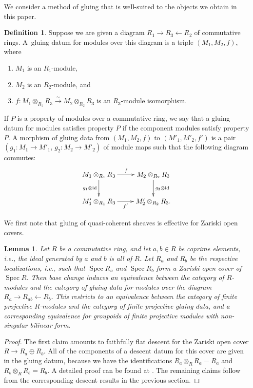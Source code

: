 \documentclass[pdftex]{sigma}
\DeclareMathOperator{\Spec}{Spec}
\newcommand{\simto}{\overset{\sim}{\to}}
\newtheorem{lem}[thm]{Lemma}
\theoremstyle{definition}
\newtheorem{defn}[thm]{Definition}
\begin{document}
We consider a method of gluing that is well-suited to the objects we obtain in this paper.

\begin{defn}Suppose we are given a diagram $R_1 \to R_3 \leftarrow R_2$ of commutative rings. A~gluing datum for modules over this diagram is a triple $(M_1, M_2, f)$, where
\begin{enumerate}\itemsep=0pt
\item[1)] $M_1$ is an $R_1$-module,
\item[2)] $M_2$ is an $R_2$-module, and
\item[3)] $f\colon M_1 \otimes_{R_1} R_3 \simto M_2 \otimes_{R_2} R_3$ is an $R_3$-module isomorphism.
\end{enumerate}
If $P$ is a property of modules over a commutative ring, we say that a gluing datum for modules satisfies property $P$ if the component modules satisfy property $P$. A morphism of gluing data from $(M_1, M_2, f)$ to $(M'_1, M'_2, f')$ is a pair $(g_1\colon M_1 \to M'_1,\, g_2\colon M_2 \to M'_2)$ of module maps such that the following diagram commutes:
\begin{gather*} \xymatrix{ M_1 \otimes_{R_1} R_3 \ar[r]^-{f} \ar[d]_{g_1 \otimes {\rm id}} & M_2 \otimes_{R_2} R_3 \ar[d]^{g_2 \otimes {\rm id}} \\ M'_1 \otimes_{R_1} R_3 \ar[r]_-{f'} & M'_2 \otimes_{R_2} R_3. } \end{gather*}
\end{defn}

We first note that gluing of quasi-coherent sheaves is effective for Zariski open covers.

\begin{lem} \label{lem:zariski-gluing-data-for-modules}Let $R$ be a commutative ring, and let $a,b \in R$ be coprime elements, i.e., the ideal generated by $a$ and $b$ is all of $R$. Let $R_a$ and $R_b$ be the respective localizations, i.e., such that $\Spec R_a$ and $\Spec R_b$ form a Zariski open cover of $\Spec R$. Then base change induces an equivalence between the category of $R$-modules and the category of gluing data for modules over the diagram $R_a \to R_{ab} \leftarrow R_b$. This restricts to an equivalence between the category of finite projective $R$-modules and the category of finite projective gluing data, and a corresponding equivalence for groupoids of finite projective modules with non-singular bilinear form.
\end{lem}
\begin{proof}
The first claim amounts to faithfully flat descent for the Zariski open cover $R \to R_a \oplus R_b$. All of the components of a descent datum for this cover are given in the gluing datum, because we have the identifications $R_a \otimes_{R} R_a = R_a$ and $R_b \otimes_{R} R_b = R_b$. A detailed proof can be found at \cite[\href{https://stacks.math.columbia.edu/tag/00EQ}{Lemma 00EQ}]{Stacks}. The remaining claims follow from the corresponding descent results in the previous section.
\end{proof}
\end{document}
